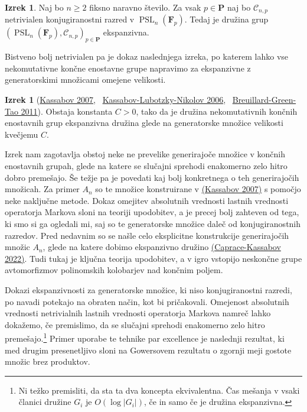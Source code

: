 \documentclass[11pt]{book}
\def\conclass{\mathcal{C}}
\def\FF{\mathbf{F}}
\def\PP{\mathbf{P}}
\DeclareMathOperator\PSL{PSL}
\theoremstyle{definition}
\theoremstyle{zgled}
\theoremstyle{zgledbrezstevilke}
\theoremstyle{odprtproblem}
\theoremstyle{domacanaloga}
\theoremstyle{izrek}
\newtheorem{izrek}[theorem]{Izrek}
\begin{document}
\begin{izrek}
Naj bo $n \geq 2$ fiksno naravno število. Za vsak $p \in \PP$ naj bo $\conclass_{n,p}$ netrivialen konjugiranostni razred v $\PSL_n(\FF_p)$. Tedaj je družina grup $( \PSL_n(\FF_p), \conclass_{n,p} )_{p \in \PP}$ ekspanzivna.
\end{izrek}

Bistveno bolj netrivialen pa je dokaz naslednjega izreka, po katerem lahko vse nekomutativne končne enostavne grupe napravimo za ekspanzivne z generatorskimi množicami omejene velikosti.

\begin{izrek}[\href{https://link.springer.com/article/10.1007/s00222-007-0065-y}{Kassabov 2007}, \ \href{https://www.pnas.org/doi/abs/10.1073/pnas.0510337103}{Kassabov-Lubotzky-Nikolov 2006}, \ \href{https://terrytao.wordpress.com/2010/05/06/suzuki-groups-as-expanders/}{Breuillard-Green-Tao 2011}]
Obstaja konstanta $C > 0$, tako da je družina nekomutativnih končnih enostavnih grup ekspanzivna družina glede na generatorske množice velikosti kvečjemu $C$.
\end{izrek}

Izrek nam zagotavlja obstoj neke ne prevelike generirajoče množice v končnih enostavnih grupah, glede na katere se slučajni sprehodi enakomerno zelo hitro dobro premešajo. Še težje pa je povedati kaj bolj konkretnega o teh generirajočih množicah. Za primer $A_n$ so te množice konstruirane v \href{https://link.springer.com/article/10.1007/s00222-007-0065-y}{(Kassabov 2007)} s pomočjo neke naključne metode. Dokaz omejitev absolutnih vrednosti lastnih vrednosti operatorja Markova sloni na teoriji upodobitev, a je precej bolj zahteven od tega, ki smo si ga ogledali mi, saj so te generatorske množice daleč od konjugiranostnih razredov. Pred nedavnim so se našle celo eksplicitne konstrukcije generirajočih množic $A_n$, glede na katere dobimo ekspanzivno družino \href{https://arxiv.org/abs/2210.00730}{(Caprace-Kassabov 2022)}. Tudi tukaj je ključna teorija upodobitev, a v igro vstopijo neskončne grupe avtomorfizmov polinomskih kolobarjev nad končnim poljem.

Dokazi ekspanzivnosti za generatorske množice, ki niso konjugiranostni razredi, po navadi potekajo na obraten način, kot bi pričakovali. Omejenost absolutnih vrednosti netrivialnih lastnih vrednosti operatorja Markova namreč lahko dokažemo, če premislimo, da se slučajni sprehodi enakomerno zelo hitro premešajo.\footnote{Ni težko premisliti, da sta ta dva koncepta ekvivalentna. Čas mešanja v vsaki članici družine $G_i$ je $O(\log |G_i|)$, če in samo če je družina ekspanzivna.} Primer uporabe te tehnike par excellence je naslednji rezultat, ki med drugim presenetljivo sloni na Gowersovem rezultatu o zgornji meji gostote množic brez produktov.
\end{document}
